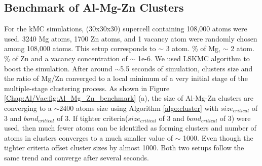 \subsection{Benchmark of Al-Mg-Zn Clusters}
\label{Chap:Al/Vac:benchmark}
For the \ac{kMC} simulations, (30x30x30) supercell containing 108,000 atoms were used. 3240 Mg atoms, 1700 Zn atoms, and 1 vacancy atom were randomly chosen among 108,000 atoms. This setup corresponds to $\sim$ 3 atom. \% of Mg, $\sim$ 2 atom. \% of Zn and a vacancy concentration of $\sim$ 1e-6. We used \ac{LSKMC} algorithm to boost the simulation. After around $\sim$5.5 seconds of simulation, clusters size and the ratio of Mg/Zn converged to a local minimum of a very initial stage of the multiple-stage clustering process. As shown in Figure \ref{Chap:Al/Vac:fig:Al_Mg_Zn_benchmark} (a), the size of Al-Mg-Zn clusters are converging to a $\sim$2400 atoms size using Algorithm \ref{algo:cluster} with $size_{critical}$ of 3 and $bond_{critical}$ of 3. If tighter criteria($size_{critical}$ of 3 and $bond_{critical}$ of 3) were used, then much fewer atoms can be identified as forming clusters and number of atoms in clusters converges to a much smaller value of $\sim$ 1000. Even though the tighter criteria offset cluster sizes by almost 1000. Both two setups follow the same trend and converge after several seconds.

